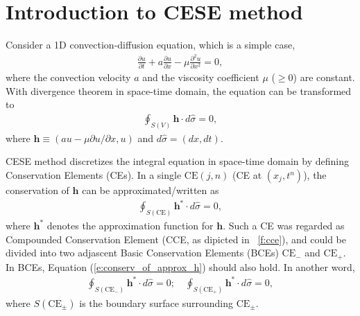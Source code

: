 \documentclass[letterpaper,12pt,dvips]{article}
\renewcommand{\vec}[1]{\mathbf{#1}}
\numberwithin{equation}{section}
\begin{document}
\section{Introduction to CESE method}
\label{s:cese_intro}

Consider a 1D convection-diffusion equation, which is a simple case, 
\begin{align}
    \frac{\partial u}{\partial t} + a\frac{\partial u}{\partial x} 
  - \mu\frac{\partial^2u}{\partial x^2} = 0, \label{e:conv_diff_govern}
\end{align}
where the convection velocity $a$ and the viscosity coefficient $\mu$ 
($\ge0$) are constant.
With divergence theorem in space-time domain, the equation can be 
transformed to 
\begin{align}
  \oint_{S(V)}\vec{h}\cdot d\hat{\sigma}=0, \label{e:conservation}
\end{align}
where $\vec{h}\equiv(au-\mu\partial u/\partial x,u)$ and 
$d\hat{\sigma}=(dx, dt)$.

CESE method discretizes the integral equation in space-time domain by 
defining Conservation Elements (CEs).
In a single $\mathrm{CE}(j,n)$ (CE at $(x_j,t^n)$), the conservation of 
$\vec{h}$ can be approximated/written as 
\begin{align}
  \oint_{S(\mathrm{CE})}\vec{h}^*\cdot d\hat{\sigma} = 0, 
    \label{e:conserv_of_approx_h}
\end{align}
where $\vec{h}^*$ denotes the approximation function for $\vec{h}$.
Such a CE was regarded as Compounded Conservation Element (CCE, as 
dipicted in \figurename~\ref{f:cce}), and 
could be divided into two adjascent Basic Conservation Elements (BCEs) 
$\mathrm{CE}_-$ and $\mathrm{CE}_+$.
In BCEs, Equation (\ref{e:conserv_of_approx_h}) should also hold.
In another word, 
\begin{align*}
  \oint_{S(\mathrm{CE}_-)}\vec{h}^*\cdot d\hat{\sigma} = 0; \quad
  \oint_{S(\mathrm{CE}_+)}\vec{h}^*\cdot d\hat{\sigma} = 0, 
\end{align*}
where $S(\mathrm{CE}_{\pm})$ is the boundary surface surrounding 
$\mathrm{CE}_{\pm}$.
\end{document}

